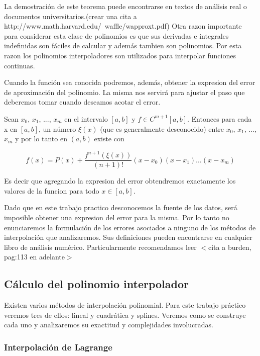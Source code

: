 La demostración de este teorema puede encontrarse en textos de análisis real o documentos universitarios.(crear una cita a http://www.math.harvard.edu/~waffle/wapproxt.pdf)
Otra razon importante para considerar esta clase de polinomios es que sus derivadas e integrales indefinidas son fáciles de calcular y además tambien son polinomios. Por esta razon los polinomios interpoladores son utilizados para interpolar funciones continuas.

Cuando la función sea conocida podremos, además, obtener la expresion del error de aproximación del polinomio. La misma nos servirá para ajustar el paso que deberemos tomar cuando deseamos acotar el error. 

\begin{theorem}
	\item Sean $x_0$, $x_1$, ..., $x_m$ en el intervalo $[a, b]$ y $f \in C^{m+1}[a, b]$. Entonces para cada x en $[a, b]$, un número $\xi(x)$ (que es generalmente desconocido) entre $x_0$, $x_1$, ..., $x_m$ y por lo tanto en $(a, b)$ existe con	
\end{theorem}

\begin{equation}
	f(x) = P(x) + \dfrac{f^{n+1}(\xi(x))}{(n+1)!}(x - x_0)(x - x_1)\dots(x - x_m)
\end{equation}

Es decir que agregando la expresion del error obtendremos exactamente los valores de la funcion para todo $x \in [a, b]$.

Dado que en este trabajo practico desconocemos la fuente de los datos, será imposible obtener una expresion del error para la misma. Por lo tanto no enunciaremos la formulación de los errores asociados a ninguno de los métodos de interpolación que analizaremos. Sus definiciones pueden encontrarse en cualquier libro de análisis numérico. Particularmente recomendamos leer $<$cita a burden, pag:113 en adelante$>$

\subsection{Cálculo del polinomio interpolador}

Existen varios métodos de interpolación polinomial. Para este trabajo práctico veremos tres de ellos: lineal y cuadrática y splines. Veremos como se construye cada uno y analizaremos su exactitud y complejidades involucradas.

\subsubsection{Interpolación de Lagrange}

